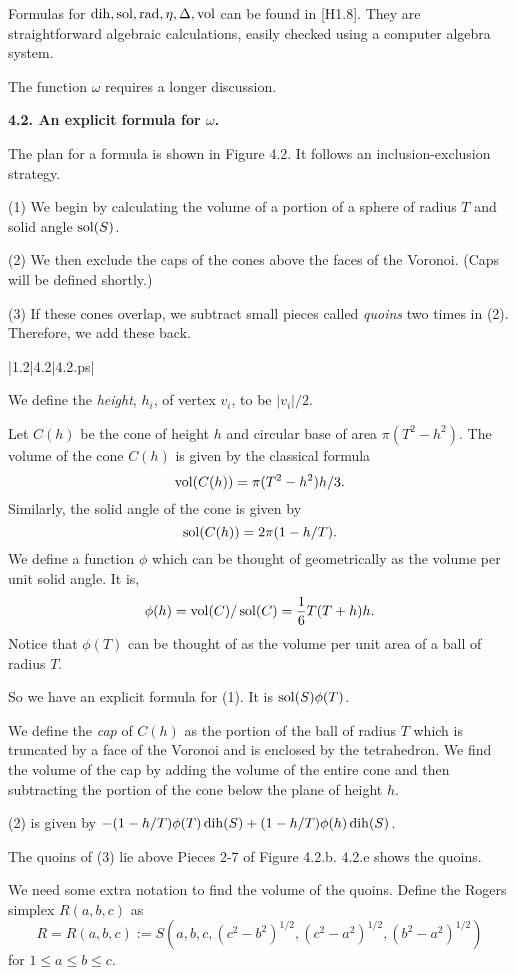 Formulas for $\operatorname{dih}, \operatorname{sol}, \operatorname{rad}, \eta, \Delta, \operatorname{vol}$  can be found in [H1.8].  
They are straightforward algebraic calculations,
 easily checked using a computer algebra system.

The function $\omega$ requires a longer discussion.

\bigskip

{\bf 4.2.  An explicit formula for $\omega$.}

\bigskip

The plan for a formula is shown in Figure 4.2.  It follows an inclusion-exclusion strategy. 

(1) We begin by calculating the volume of a portion of a sphere of radius $T$ and solid 
angle $\operatorname{sol}(S)$.  

(2) We then exclude the 
caps of the cones above the faces of the Voronoi.  (Caps will be defined shortly.)

(3) If these cones 
overlap, we subtract small pieces called {\it quoins} two times in (2).
  Therefore, we add these back.  


\gram|1.2|4.2|4.2.ps|  %


We define the {\it height}, $h_i$, of vertex $v_i$, to be $|v_i|/2$.

Let $C(h)$ be the cone of height $h$ and circular base of area 
$\pi (T^2-h^2)$.
The volume of the cone $C(h)$ is given by the classical formula $$\operatorname{vol}(C(h))=\pi (T^2-h^2) h/3.$$ 
 Similarly, the solid angle of the cone is given by $$\operatorname{sol}(C(h))=2\pi (1-h/T).$$ 
 We define a function $\phi$ which can be thought of geometrically as the volume per 
unit solid angle.  It is, $$\phi(h)=\operatorname{vol}(C)/\operatorname{sol}(C)=\frac 1 6 T(T+h)h.$$  Notice that 
$\phi(T)$ can be thought of as the volume per unit area of a ball of radius $T$.  

So we have an explicit formula for (1).  It is 
$\operatorname{sol}(S)\phi(T)$.  

We define the {\it cap} of $C(h)$ as the portion of the ball of radius $T$ 
which is truncated by a face of the Voronoi and is enclosed by the tetrahedron.
We find the volume of the cap by adding the volume of the entire cone and then 
subtracting the portion of the cone below the plane of height $h$.

(2) is given by
$-(1-h/T)\phi(T)\operatorname{dih}(S)+(1-h/T)\phi(h)\operatorname{dih}(S)$.

The quoins of (3) lie above Pieces 2-7 of Figure 4.2.b.  4.2.e shows the quoins.  

We need some extra notation to find the volume of the quoins.
Define the Rogers simplex $R(a,b,c)$ as 
$$R=R(a,b,c):= S(a,b,c,(c^2-b^2)^{1/2},(c^2-a^2)^{1/2},(b^2-a^2)^{1/2})$$
for $1\le a\le b\le c$.

